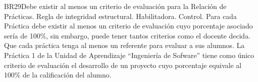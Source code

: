 \begin{BussinesRule}{BR29}{Debe existir al menos un criterio de evaluación para la Relación de Prácticas.}
    \BRitem[Tipo:] Regla de integridad estructural.
    \BRitem[Clase:] Habilitadora.
    \BRitem[Nivel:] Control.
    \BRitem[Descripción:] Para cada Práctica debe existir al menos un criterio de evaluación cuyo porcentaje asociado sería de 100\%, sin embargo, puede tener tantos criterios como el docente decida.
    \BRitem[Motivación:] Que cada práctica tenga al menos un referente para evaluar a sus alumnos.
     La Práctica 1 de la Unidad de Aprendizaje ``Ingeniería de Sofware'' tiene como único criterio de evaluación el desarrollo de un proyecto cuyo porcentaje equivale al 100\% de la calificación del alumno.
\end{BussinesRule}

